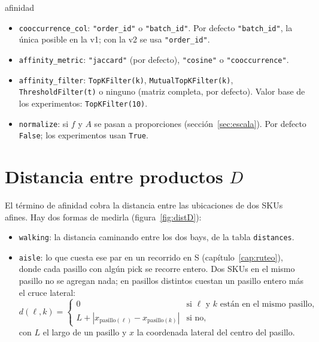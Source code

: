 \documentclass[11pt,a4paper,oneside]{report}
\newcommand{\code}[1]{\texttt{\small #1}}
\begin{document}
\begin{hiper}{afinidad}
\begin{itemize}
  \item \code{cooccurrence\_col}: \code{"order\_id"} o \code{"batch\_id"}. Por defecto
        \code{"batch\_id"}, la única posible en la v1; con la v2 se usa \code{"order\_id"}.
  \item \code{affinity\_metric}: \code{"jaccard"} (por defecto), \code{"cosine"} o
        \code{"cooccurrence"}.
  \item \code{affinity\_filter}: \code{TopKFilter(k)}, \code{MutualTopKFilter(k)},
        \code{ThresholdFilter(t)} o ninguno (matriz completa, por defecto). Valor base de
        los experimentos: \code{TopKFilter(10)}.
  \item \code{normalize}: si $f$ y $A$ se pasan a proporciones (sección~\ref{sec:escala}).
        Por defecto \code{False}; los experimentos usan \code{True}.
\end{itemize}
\end{hiper}

\section{Distancia entre productos $D$}
\label{sec:distanciaD}

El término de afinidad cobra la distancia entre las ubicaciones de dos SKUs afines. Hay dos
formas de medirla (figura~\ref{fig:distD}):

\begin{itemize}
  \item \code{walking}: la distancia caminando entre los dos bays, de la tabla
        \code{distances}.
  \item \code{aisle}: lo que cuesta ese par en un recorrido en S (capítulo~\ref{cap:ruteo}),
        donde cada pasillo con algún pick se recorre entero. Dos SKUs en el mismo pasillo no se
        agregan nada; en pasillos distintos cuestan un pasillo entero más el cruce lateral:
        \[
        d(\ell, k) = \begin{cases}
          0 & \text{si } \ell \text{ y } k \text{ están en el mismo pasillo,} \\
          L + |x_{\text{pasillo}(\ell)} - x_{\text{pasillo}(k)}| & \text{si no,}
        \end{cases}
        \]
        con $L$ el largo de un pasillo y $x$ la coordenada lateral del centro del pasillo.
\end{itemize}
\end{document}
